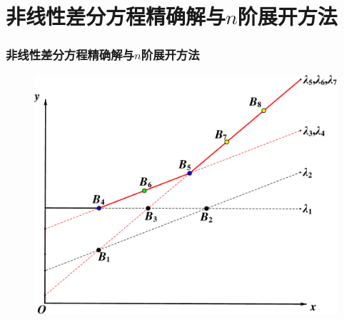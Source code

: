 \section{非线性差分方程精确解与$n$阶展开方法}
\begin{frame}
\frametitle{非线性差分方程精确解与$n$阶展开方法}
\end{frame}

\begin{frame}
\begin{figure}
\centering
\includegraphics[height=0.9\textheight]{../paper/fig/ps.pdf}
\end{figure}
\end{frame}